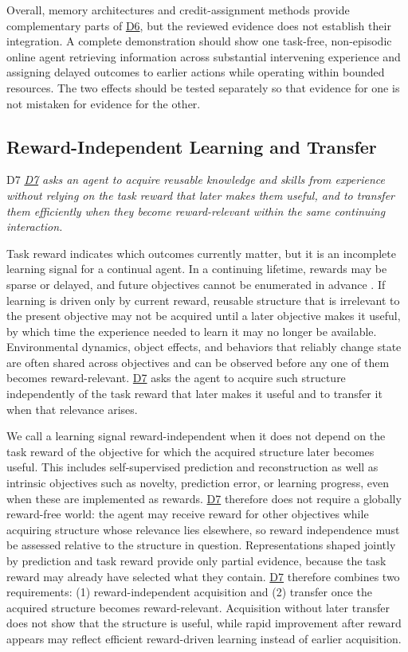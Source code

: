 \documentclass[10pt,journal,compsoc]{IEEEtran}
\DeclareRobustCommand{\Dref}[1]{\hyperref[sec:d#1]{D#1}}
\begin{document}
Overall, memory architectures and credit-assignment methods provide complementary parts of \Dref{6}, but the reviewed evidence does not establish their integration.
A complete demonstration should show one task-free, non-episodic online agent retrieving information across substantial intervening experience and assigning delayed outcomes to earlier actions while operating within bounded resources.
The two effects should be tested separately so that evidence for one is not mistaken for evidence for the other.

\subsection{Reward-Independent Learning and Transfer}
\label{sec:d7}

\begin{briefbox}[behaviorbrief]{D7}
    \emph{\Dref{7} asks an agent to acquire reusable knowledge and skills from experience without relying on the task reward that later makes them useful, and to transfer them efficiently when they become reward-relevant within the same continuing interaction.}
\end{briefbox}

\noindent Task reward indicates which outcomes currently matter, but it is an incomplete learning signal for a continual agent.
In a continuing lifetime, rewards may be sparse or delayed, and future objectives cannot be enumerated in advance \cite{schaul2018,khetarpal2022}.
If learning is driven only by current reward, reusable structure that is irrelevant to the present objective may not be acquired until a later objective makes it useful, by which time the experience needed to learn it may no longer be available.
Environmental dynamics, object effects, and behaviors that reliably change state are often shared across objectives and can be observed before any one of them becomes reward-relevant.
\Dref{7} asks the agent to acquire such structure independently of the task reward that later makes it useful and to transfer it when that relevance arises.

We call a learning signal reward-independent when it does not depend on the task reward of the objective for which the acquired structure later becomes useful.
This includes self-supervised prediction and reconstruction as well as intrinsic objectives such as novelty, prediction error, or learning progress, even when these are implemented as rewards.
\Dref{7} therefore does not require a globally reward-free world: the agent may receive reward for other objectives while acquiring structure whose relevance lies elsewhere, so reward independence must be assessed relative to the structure in question.
Representations shaped jointly by prediction and task reward provide only partial evidence, because the task reward may already have selected what they contain.
\Dref{7} therefore combines two requirements: (1) reward-independent acquisition and (2) transfer once the acquired structure becomes reward-relevant.
Acquisition without later transfer does not show that the structure is useful, while rapid improvement after reward appears may reflect efficient reward-driven learning instead of earlier acquisition.
\end{document}
